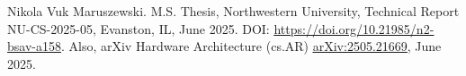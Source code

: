 
\vspace{6pt}

\hfill\begin{minipage}{\dimexpr\textwidth-24pt}\small
Nikola Vuk Maruszewski. M.S. Thesis, Northwestern University, Technical Report NU-CS-2025-05,
Evanston, IL, June 2025. DOI:
\href{https://doi.org/10.21985/n2-bsav-a158}{\ul{https://doi.org/10.21985/n2-bsav-a158}}.
Also, arXiv Hardware Architecture (cs.AR)
\href{https://arxiv.org/abs/2505.21669}{\ul{arXiv:2505.21669}}, June 2025. 
\end{minipage}




\resumeSubHeadingListEnd

